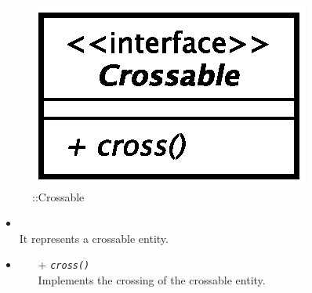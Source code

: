 \begin{figure}[h]
\centering
\includegraphics[scale=0.6,keepaspectratio]{images/solution/app/backend/crossable.eps}
\caption{\pReactiveComponentStretchDecoration::Crossable}
\label{fig:sd-app-crossable}
\end{figure}
\FloatBarrier
\begin{itemize}
  \item \textbf{\descr} \\
    It represents a crossable entity. 
\item \textbf{\ops}
  \begin{itemize}
    \item[+] \texttt{\textit{cross()}} \\
Implements the crossing of the crossable entity.
  \end{itemize}
\end{itemize}
